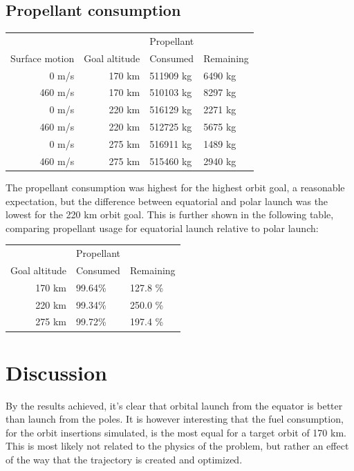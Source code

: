 \documentclass[11pt]{article}
\begin{document}
\subsection{Propellant consumption}
\begin{center}
  \begin{tabular}{ r | r  | l  l  }
     &   &   Propellant   \\
    Surface motion &  Goal altitude & Consumed & Remaining \\
    \hline
    0 m/s & 170 km & 511909 kg & 6490 kg \\
    460 m/s & 170 km & 510103 kg & 8297 kg \\
    \hline
    0 m/s & 220 km & 516129 kg & 2271 kg \\
    460 m/s & 220 km  & 512725 kg & 5675 kg \\
    \hline
    0 m/s & 275 km & 516911 kg & 1489 kg \\
    460 m/s & 275 km & 515460 kg & 2940 kg
  \end{tabular}
\end{center}
The propellant consumption was highest for the highest orbit goal, a reasonable expectation, but the difference between equatorial and polar launch was the lowest for the 220 km orbit goal.
This is further shown in the following table, comparing propellant usage for equatorial launch relative to polar launch:
\begin{center}
  \begin{tabular}{ r | l  l  }
     &   Propellant   \\
    Goal altitude & Consumed & Remaining \\
    \hline
    170 km & 99.64\% & 127.8 \% \\
    220 km & 99.34\% & 250.0 \% \\
    275 km & 99.72\% & 197.4 \%
  \end{tabular}
\end{center}


\section{Discussion}

By the results achieved, it's clear that orbital launch from the equator is better than launch from the poles. 
It is however interesting that the fuel consumption, for the orbit insertions simulated, is the most equal for a target orbit of 170 km. 
This is most likely not related to the physics of the problem, but rather an effect of the way that the trajectory is created and optimized.
\end{document}
